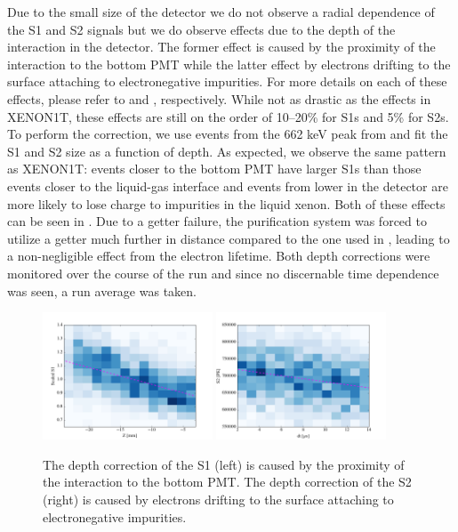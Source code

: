 Due to the small size of the detector we do not observe a radial dependence of the S1 and S2 signals but we do observe effects due to the depth of the interaction in the detector.  The former effect is caused by the proximity of the interaction to the bottom PMT while the latter effect by electrons drifting to the surface attaching to electronegative impurities.  For more details on each of these effects, please refer to  and , respectively.  While not as drastic as the effects in XENON1T, these effects are still on the order of 10--20\% for S1s and 5\% for S2s.  To perform the correction, we use events from the 662 keV peak from \cesium{} and fit the S1 and S2 size as a function of depth.  As expected, we observe the same pattern as XENON1T: events closer to the bottom PMT have larger S1s than those events closer to the liquid-gas interface and events from lower in the detector are more likely to lose charge to impurities in the liquid xenon.  Both of these effects can be seen in .  Due to a getter failure, the purification system was forced to utilize a getter much further in distance compared to the one used in , leading to a non-negligible effect from the electron lifetime.  Both depth corrections were monitored over the course of the run and since no discernable time dependence was seen, a run average was taken.


\begin{figure}[t]
        \centering
	\includegraphics[width=0.45\textwidth]{nerix_s1_z_correction}
	\includegraphics[width=0.45\textwidth]{nerix_s2_dt_correction}
	\caption{The depth correction of the S1 (left) is caused by the proximity of the interaction to the bottom PMT.  The depth correction of the S2 (right) is caused by electrons drifting to the surface attaching to electronegative impurities.}
	\label{fig:nerix_pos_correction}
\end{figure}




